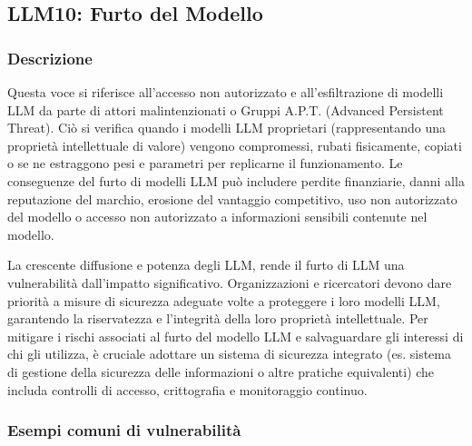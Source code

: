 \documentclass[
]{article}
\author{}
\date{}
\begin{document}
\subsection{LLM10: Furto del Modello}\label{llm10-furto-del-modello}

\subsubsection{Descrizione}\label{descrizione}

Questa voce si riferisce all'accesso non autorizzato e all'esfiltrazione
di modelli LLM da parte di attori malintenzionati o Gruppi A.P.T.
(Advanced Persistent Threat). Ciò si verifica quando i modelli LLM
proprietari (rappresentando una proprietà intellettuale di valore)
vengono compromessi, rubati fisicamente, copiati o se ne estraggono pesi
e parametri per replicarne il funzionamento. Le conseguenze del furto di
modelli LLM può includere perdite finanziarie, danni alla reputazione
del marchio, erosione del vantaggio competitivo, uso non autorizzato del
modello o accesso non autorizzato a informazioni sensibili contenute nel
modello.

La crescente diffusione e potenza degli LLM, rende il furto di LLM una
vulnerabilità dall'impatto significativo. Organizzazioni e ricercatori
devono dare priorità a misure di sicurezza adeguate volte a proteggere i
loro modelli LLM, garantendo la riservatezza e l'integrità della loro
proprietà intellettuale. Per mitigare i rischi associati al furto del
modello LLM e salvaguardare gli interessi di chi gli utilizza, è
cruciale adottare un sistema di sicurezza integrato (es. sistema di
gestione della sicurezza delle informazioni o altre pratiche
equivalenti) che includa controlli di accesso, crittografia e
monitoraggio continuo.

\subsubsection{Esempi comuni di
vulnerabilità}\label{esempi-comuni-di-vulnerabilituxe0}
\end{document}
